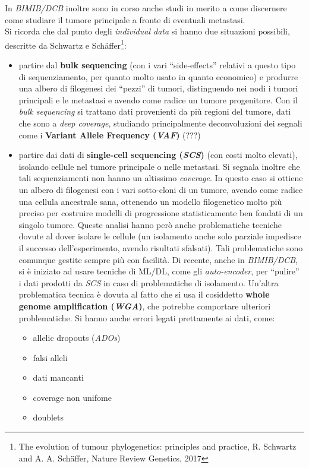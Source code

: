 \documentclass[a4paper,12pt, oneside]{book}
\begin{document}
In \textit{BIMIB/DCB} inoltre sono in corso anche studi in merito a come
discernere come studiare il tumore principale a fronte di eventuali metastasi.\\
Si ricorda che dal punto degli \textit{individual data} si hanno due situazioni
possibili, descritte da Schwartz e Sch\"{a}ffer\footnote{The evolution of tumour
  phylogenetics: principles and practice, R. Schwartz and A. A. Sch\"{a}ffer,
  Nature Review Genetics, 2017}:
\begin{itemize}
  \item partire dal \textbf{bulk sequencing} (con i vari ``side-effects''
  relativi a questo tipo di sequenziamento, per quanto molto usato in quanto
  economico) e produrre una albero di filogenesi 
  dei ``pezzi'' di tumori, distinguendo nei nodi i tumori principali e le
  metastasi e avendo come radice un tumore progenitore. Con il \textit{bulk
    sequencing} si trattano dati provenienti da più regioni del tumore, dati che
  sono a \textit{deep coverage}, studiando principalmente deconvoluzioni dei
  segnali come i \textbf{Variant Allele Frequency (\textit{VAF})} (???)
  \item partire dai dati di \textbf{single-cell sequencing (\textit{SCS})} (con
  costi molto 
  elevati), isolando cellule nel tumore principale o nelle metastasi. Si segnala
  inoltre che tali sequenziamenti non
  hanno un altissimo \textit{coverage}. In questo 
  caso si ottiene un albero di filogenesi con i vari sotto-cloni di un tumore,
  avendo come radice una cellula ancestrale sana,
  ottenendo un modello filogenetico molto più preciso per costruire modelli di
  progressione statisticamente ben fondati di un singolo tumore. Queste analisi
  hanno però anche problematiche tecniche dovute al dover isolare le cellule (un
  isolamento anche solo parziale impedisce il successo dell'esperimento, avendo
  risultati sfalsati). Tali problematiche sono comunque gestite sempre più con
  facilità. Di recente, anche in \textit{BIMIB/DCB}, si è iniziato ad usare
  tecniche di ML/DL, come gli \textit{auto-encoder}, per ``pulire'' i dati
  prodotti da \textit{SCS} in caso di problematiche di isolamento. Un'altra
  problematica tecnica è dovuta al fatto che si usa il cosiddetto \textbf{whole
    genome amplification (\textit{WGA})}, che potrebbe comportare ulteriori
  problematiche. Si hanno anche errori legati prettamente ai dati, come:
  \begin{itemize}
    \item allelic dropouts (\textit{ADOs})
    \item falsi alleli
    \item dati mancanti
    \item coverage non unifome
    \item doublets
  \end{itemize}
\end{itemize}
\end{document}

